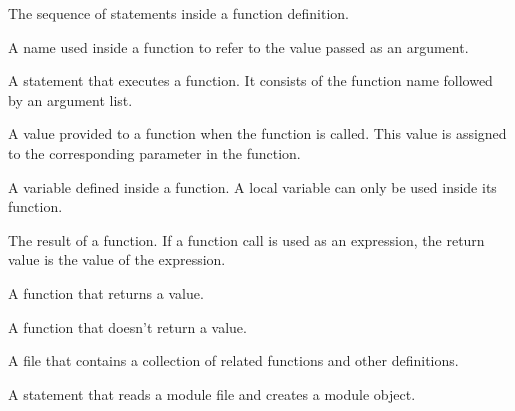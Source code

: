 \begin{vocabulary}[body:] The sequence of statements inside a function definition.
\end{vocabulary}
	
\begin{vocabulary}[parameter:] A name used inside a function to refer to the value
passed as an argument.
\end{vocabulary}
	
\begin{vocabulary} A statement that executes a function. It
consists of the function name followed by an argument list.
\end{vocabulary}
	
\begin{vocabulary}[argument:]  A value provided to a function when the function is called.
This value is assigned to the corresponding parameter in the function.
\end{vocabulary}
	
\begin{vocabulary}  A variable defined inside a function.  A local
variable can only be used inside its function.
\end{vocabulary}
	
\begin{vocabulary}  The result of a function.  If a function call
is used as an expression, the return value is the value of
the expression.
\end{vocabulary}
	
\begin{vocabulary} A function that returns a value.
\end{vocabulary}
	
\begin{vocabulary} A function that doesn't return a value.
\end{vocabulary}
	
\begin{vocabulary}[module:] A file that contains a
collection of related functions and other definitions.
\end{vocabulary}
	
\begin{vocabulary} A statement that reads a module file and creates
a module object.
\end{vocabulary}
	
